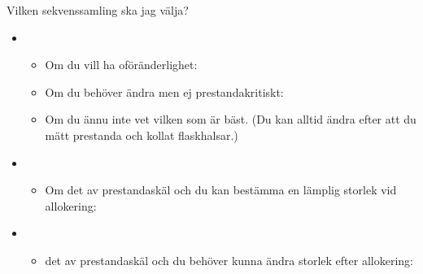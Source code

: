 \begin{Slide}{Vilken sekvenssamling ska jag välja?}
\begin{itemize}

\item {} 
  \begin{itemize}\SlideFontSmall
  \item Om du vill ha oföränderlighet: 
  \item Om du behöver ändra men ej prestandakritiskt:\\ 
  \item Om du ännu inte vet vilken som är bäst. (Du kan alltid ändra efter att du mätt prestanda och kollat flaskhalsar.)
  \end{itemize}

\item {} 
  \begin{itemize}\SlideFontSmall
  \item Om det  av prestandaskäl och du kan bestämma en lämplig storlek vid allokering:\\ 
  \end{itemize}

\item {}  
  \begin{itemize}\SlideFontSmall
  \item det  av prestandaskäl och du behöver kunna ändra storlek efter allokering:\\  
  \end{itemize}

\end{itemize}
\end{Slide}







